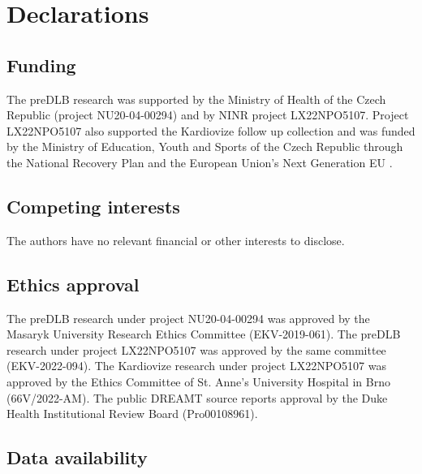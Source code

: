 \documentclass[referee,pdflatex,sn-vancouver-num]{sn-jnl}
\begin{document}
\backmatter



\section*{Declarations}

\subsection*{Funding}

The preDLB research was supported by the Ministry of Health of the
Czech Republic (project NU20-04-00294) and by NINR project LX22NPO5107.
Project LX22NPO5107 also supported the Kardiovize follow up collection and was
funded by the Ministry of Education, Youth and Sports of the Czech Republic
through the National Recovery Plan and the European Union's Next Generation EU
\cite{ninr2023report,ninrproject}.

\subsection*{Competing interests}

The authors have no relevant financial or other interests to disclose.

\subsection*{Ethics approval}

The preDLB research under project NU20-04-00294 was approved by the Masaryk
University Research Ethics Committee (EKV-2019-061). The preDLB research under
project LX22NPO5107 was approved by the same committee (EKV-2022-094).
The Kardiovize research under project LX22NPO5107 was approved by the Ethics
Committee of St. Anne's University Hospital in Brno (66V/2022-AM).
The public DREAMT source reports approval by the Duke Health Institutional
Review Board (Pro00108961).

\subsection*{Data availability}
\end{document}

